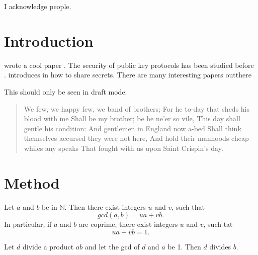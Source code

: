 \begin{acknowledgements}
I acknowledge people.
\end{acknowledgements}
\tableofcontents

\mainmatter

\chapter{Introduction}
\nocite{*}
\citeauthor{Shannon1946} wrote a cool paper \citep{Shannon1946}. The security of public key protocols has been studied before \citep{Dolev1983}. \citeauthor{Shamir1979} introduces in \citet{Shamir1979} how to share secrets.
There are many interesting papers outthere \cite{Needham1978,Rivest1978,Merkle1978,Diffie1976,Shannon1949,Ziv1977, Huffman1952, Hamming1950}

\begin{fncycomment}
This should only be seen in draft mode.
\end{fncycomment}

\begin{quote}
We few, we happy few, we band of brothers;
For he to-day that sheds his blood with me
Shall be my brother; be he ne'er so vile,
This day shall gentle his condition:
And gentlemen in England now a-bed
Shall think themselves accursed they were not here,
And hold their manhoods cheap whiles any speaks
That fought with us upon Saint Crispin's day.
\end{quote}

\lipsum
\chapter{Method}

\lipsum

\begin{theorem}\label{th:a}
Let $a$ and $b$ be in $\mathbb{N}$. Then there exist integers $u$ and $v$, such that
\[
gcd(a,b) = ua+vb.
\]
In particular, if $a$ and $b$ are coprime, there exist integers $u$ and $v$, such tat
\[
ua+vb=1.
\]
\end{theorem}

\begin{lemma}\label{lem:a}
Let $d$ divide a product $ab$ and let the gcd of $d$ and $a$ be 1. Then $d$ divides $b$.
\end{lemma}

